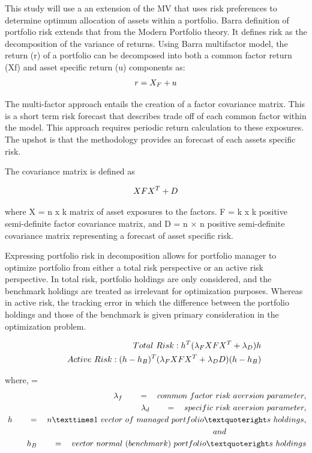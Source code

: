 \documentclass[11pt,preprint, authoryear]{elsarticle}
\numberwithin{equation}{section}
\numberwithin{figure}{section}
\numberwithin{table}{section}
\begin{document}
This study will use a an extension of the MV that uses risk preferences
to determine optimum allocation of assets within a portfolio. Barra
definition of portfolio risk extends that from the Modern Portfolio
theory. It defines risk as the decomposition of the variance of returns.
Using Barra multifactor model, the return (r) of a portfolio can be
decomposed into both a common factor return (Xf) and asset specific
return (u) components as: \begin{align} 
r= X_{F} + u \notag
\end{align}

The multi-factor approach entails the creation of a factor covariance
matrix. This is a short term risk forecast that describes trade off of
each common factor within the model. This approach requires periodic
return calculation to these exposures. The upshot is that the
methodology provides an forecast of each assets specific risk.

The covariance matrix is defined as

\begin{align}
 XFX^T + D \label{eq1} \notag
\end{align}

where X = n x k matrix of asset exposures to the factors. F = k x k
positive semi-definite factor covariance matrix, and D = n × n positive
semi-definite covariance matrix representing a forecast of asset
specific risk.

Expressing portfolio risk in decomposition allows for portfolio manager
to optimize portfolio from either a total risk perspective or an active
risk perspective. In total risk, portfolio holdings are only considered,
and the benchmark holdings are treated as irrelevant for optimization
purposes. Whereas in active risk, the tracking error in which the
difference between the portfolio holdings and those of the benchmark is
given primary consideration in the optimization problem.

\begin{align}
 Total\ Risk : h^T(\lambda_FXFX^T + \lambda_D)h\\ \quad \quad  \notag 
 Active \ Risk : (h-h_B)^T(\lambda_FXFX^T+\lambda_DD)(h-h_B) \notag
\end{align}

where, = \begin{align}
\lambda_f \quad \quad  = \quad common \ factor\ risk\ aversion\ parameter,\\ \lambda_d \quad \quad = \quad specific\ \notag risk\ aversion\ parameter,\\\ h \quad \quad = \quad n×1 \ vector\ of\ managed\ portfolio’s\ holdings,\\ and \quad \notag \quad \quad \quad \quad \quad \quad \quad \quad \quad\\h_B \quad \quad =\quad vector \ normal\ (benchmark)\ portfolio’s\ holdings \notag 
\end{align}
\end{document}
